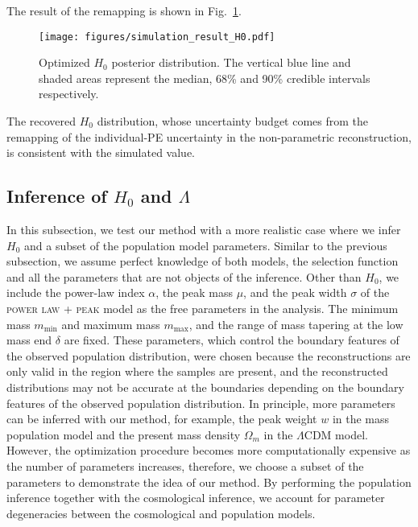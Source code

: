 \documentclass[sn-aps, pdflatex, iicol]{sn-jnl}
\begin{document}
The result of the remapping is shown in Fig.~\ref{fig:simulation_result_H0}.
\begin{figure}
    \texttt{[image: figures/simulation\_result\_H0.pdf]}
    \caption{
        Optimized $H_0$ posterior distribution.
        The vertical blue line and shaded areas represent the median, 68\% and 90\% credible intervals respectively.
    }
    \label{fig:simulation_result_H0}
\end{figure}
The recovered $H_0$ distribution, whose uncertainty budget comes from the remapping of the individual-\ac{PE} uncertainty in the non-parametric reconstruction, is consistent with the simulated value.

\subsection{Inference of $H_0$ and $\Lambda$}
\label{sec:inference_multi}

In this subsection, we test our method with a more realistic case where we infer $H_0$ and a subset of the population model parameters.
Similar to the previous subsection, we assume perfect knowledge of both models, the selection function and all the parameters that are not objects of the inference.
Other than $H_0$, we include the power-law index $\alpha$, the peak mass $\mu$, and the peak width $\sigma$ of the \textsc{power law + peak} model as the free parameters in the analysis.
The minimum mass $m_\mathrm{min}$ and maximum mass $m_\mathrm{max}$, and the range of mass tapering at the low mass end $\delta$ are fixed.
These parameters, which control the boundary features of the observed population distribution, were chosen because the reconstructions are only valid in the region where the samples are present, and the reconstructed distributions may not be accurate at the boundaries depending on the boundary features of the observed population distribution.
In principle, more parameters can be inferred with our method, for example, the peak weight $w$ in the mass population model and the present mass density $\Omega_m$ in the $\Lambda$CDM model.
However, the optimization procedure becomes more computationally expensive as the number of parameters increases, therefore, we choose a subset of the parameters to demonstrate the idea of our method.
By performing the population inference together with the cosmological inference, we account for parameter degeneracies between the cosmological and population models.
\end{document}
